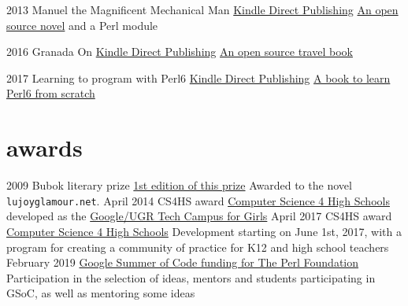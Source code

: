 \documentclass[]{friggeri-jj-cv}
\begin{document}
\begin{entrylist}
  \entry
    {2013}
    {Manuel the Magnificent Mechanical Man}
    {\href{http://www.amazon.com/dp/B00ED084BK/}{Kindle Direct Publishing}}
    {\href{http://jj.github.io/hoborg}{An open source novel} and a
      Perl module}
  \end{entrylist}

  \begin{entrylist}
  \entry
    {2016}
    {Granada On}
    {\href{https://www.amazon.com/Granada-Beaten-Track-explorations-Andalusia/dp/1523257083}{Kindle Direct Publishing}}
    {\href{http://github.com/JJ/granada-off}{An open source travel book}}
  \end{entrylist}

  \begin{entrylist}
  \entry
    {2017}
    {Learning to program with Perl6}
    {\href{https://www.amazon.com/Learning-program-Perl-Getting-programming/dp/1521795789/ref=sr_1_1?ie=UTF8&qid=1518685809&sr=8-1}{Kindle Direct Publishing}}
    {\href{http://github.com/JJ/perl6em}{A book to learn Perl6 from scratch}}
  \end{entrylist}



\section{awards}
\begin{entrylist}
 \entry
    {2009}
    {Bubok literary prize}
    {\href{http://cultura.elpais.com/cultura/2009/05/06/actualidad/1241560804_850215.html}{1st
        edition of this prize}}
    {Awarded to the novel {\tt lujoyglamour.net}.}
 \entry
    {April 2014}
    {CS4HS award}
    {\href{http://cs4hs.com}{Computer Science 4 High Schools}}
    {developed as the \href{http://cs4hs.ugr.es}{Google/UGR Tech Campus for Girls}}
 \entry
    {April 2017}
    {CS4HS award}
    {\href{http://cs4hs.com}{Computer Science 4 High Schools}}
    {Development starting on June 1st, 2017, with a program for
      creating a community of practice for K12 and high school
      teachers}
    \entry
    {February 2019}
    {\href{https://summerofcode.withgoogle.com/organizations/4713351599357952/}{Google
        Summer of Code funding for The Perl Foundation}}
    {Participation in the selection of ideas, mentors and students
      participating in GSoC, as well as mentoring some ideas}
    
\end{entrylist}
\end{document}
